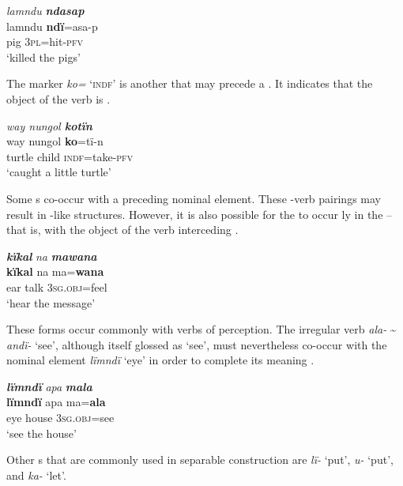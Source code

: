\ea%
    \label{ex:overview:32}
    \textit{lamndu} \textbf{\textit{ndasap}}\\
\gll    lamndu  \textbf{ndï}=asa-p\\
    pig      3\textsc{pl}=hit-\textsc{pfv}\\
\glt    ‘killed the pigs’
\z

The  marker \textit{ko=} ‘\textsc{indf’} is another  that may precede a . It indicates that the object of the verb is  .

\ea%
    \label{ex:overview:33}
    \textit{way nungol \textbf{kotïn}}\\
\gll    way  nungol  \textbf{ko}{=}tï{{}-}n\\
    turtle  child  \textsc{indf=}take-\textsc{pfv}\\
\glt    ‘caught a little tur{t}le’
\z

Some s co-occur with a preceding nominal element. These -verb pairings may result in -like structures. However, it is also possible for the  to occur ly in the  -- that is, with the object of the verb interceding .

\ea%
    \label{ex:overview:34}
    \textbf{\textit{kïkal}} \textit{na} \textbf{\textit{mawana}}\\
\gll    \textbf{kïkal}  na    ma=\textbf{wana}\\
    ear    talk  3\textsc{sg.obj}=feel\\
\glt    ‘hear the message’
\z


These  forms occur commonly with  verbs of perception. The irregular  verb \textit{ala-} {\textasciitilde} \textit{andï-} ‘see’, although itself glossed as ‘see’, must nevertheless co-occur with the nominal element \textit{lïmndï} ‘eye’ in order to complete its meaning .

\ea%
    \label{ex:overview:35}
    \textbf{\textit{lïmndï}} \textit{apa} \textbf{\textit{mala}}\\
\gll    \textbf{lïmndï}  apa    ma=\textbf{ala}\\
    eye    house  3\textsc{sg.obj}=see\\
\glt    ‘see the house’
\z

Other s that are commonly used in  separable construction are \textit{lï-} ‘put’, \textit{u-} ‘put’, and \textit{ka-} ‘let’.

